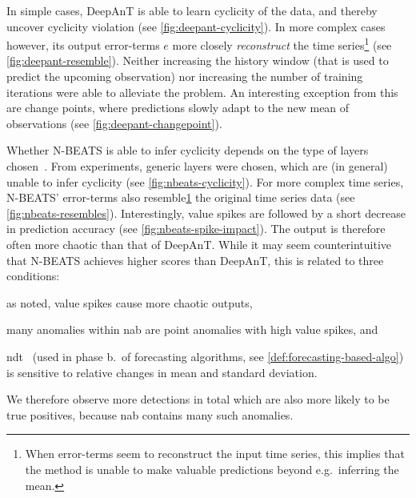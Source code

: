 \begin{description}[style=unboxed,leftmargin=0cm]
    \item[DeepAnT] In simple cases, DeepAnT is able to learn cyclicity of the data,
    and thereby uncover cyclicity violation (see \cref{fig:deepant-cyclicity}).
    In more complex cases however, its output error-terms \(e\) more closely
    \textit{reconstruct} the time series\footnote{\label{foot:err-reconstructs}When
    error-terms seem to reconstruct the input time series, this implies that the
    method is unable to make valuable predictions beyond e.g.\ inferring the mean.}
    (see \cref{fig:deepant-resemble}). Neither increasing the history window
    (that is used to predict the upcoming observation) nor increasing the number
    of training iterations were able to alleviate the problem. An interesting
    exception from this are change points, where predictions slowly adapt to the
    new mean of observations (see \cref{fig:deepant-changepoint}).
    \item[N-BEATS] Whether N-BEATS is able to infer cyclicity depends on the type
    of layers chosen~\cite[cf.][]{Oreshkin.2020}. From experiments, generic layers
    were chosen, which are (in general) unable to infer cyclicity (see \cref{fig:nbeats-cyclicity}).
    For more complex time series, N-BEATS' error-terms also resemble\cref{foot:err-reconstructs}
    the original time series data (see \cref{fig:nbeats-resembles}). Interestingly,
    value spikes are followed by a short decrease in prediction accuracy
    (see \cref{fig:nbeats-spike-impact}). The output is therefore often more
    chaotic than that of DeepAnT. While it may seem counterintuitive that N-BEATS
    achieves higher scores than DeepAnT, this is related to three conditions:
    \begin{enumerate*}[a.)]
        \item as noted, value spikes cause more chaotic outputs,
        \item many anomalies within \gls{nab} are point anomalies with high value spikes, and
        \item \gls{ndt}~\cite[cf.][]{Hundman.2018} (used in phase b.\ of
        forecasting algorithms, see \cref{def:forecasting-based-algo}) is sensitive
        to relative changes in mean and standard deviation.
    \end{enumerate*}
    
    We therefore observe more detections in total which are also more likely to
    be true positives, because \gls{nab} contains many such anomalies.


\end{description}
